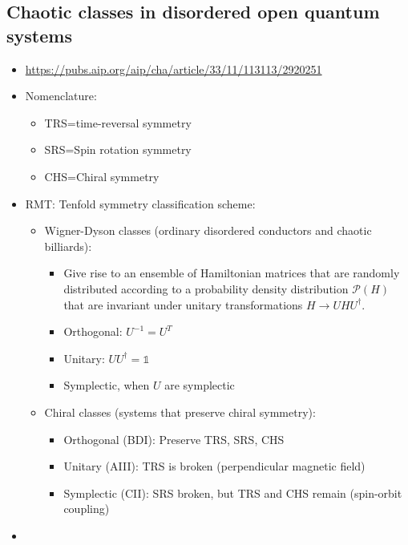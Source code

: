 \documentclass{article}
\begin{document}
\subsection{Chaotic classes in disordered open quantum systems}
\begin{itemize}
	\item \url{https://pubs.aip.org/aip/cha/article/33/11/113113/2920251}
	\item Nomenclature:
	\begin{itemize}
		\item TRS=time-reversal symmetry
		\item SRS=Spin rotation symmetry
		\item CHS=Chiral symmetry
	\end{itemize}
	\item RMT: Tenfold symmetry classification scheme:
	\begin{itemize}
		\item Wigner-Dyson classes (ordinary disordered conductors and chaotic billiards):
		\begin{itemize}
			\item Give rise to an ensemble of Hamiltonian matrices that are randomly distributed according to a probability density distribution $\mathcal{P}(H)$ that are invariant under unitary transformations $H\rightarrow UHU^\dagger$.
			\item Orthogonal: $U^{-1}=U^T$
			\item Unitary: $UU^\dagger = \mathds{1}$
			\item Symplectic, when $U$ are symplectic
		\end{itemize}
		\item Chiral classes (systems that preserve chiral symmetry): 
		\begin{itemize}
			\item Orthogonal (BDI): Preserve TRS, SRS, CHS
			\item Unitary (AIII): TRS is broken (perpendicular magnetic field)
			\item Symplectic (CII): SRS broken, but TRS and CHS remain (spin-orbit coupling)
		\end{itemize}
	\end{itemize}
	\item 
\end{itemize}
\end{document}
